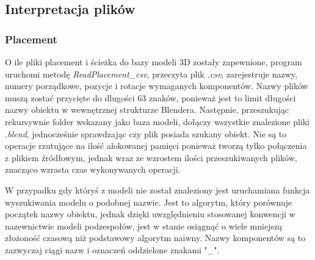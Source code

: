 \documentclass{xmgr}
\begin{document}
\subsection{Interpretacja plików}
\subsubsection{Placement}

O ile pliki placement i ścieżka do bazy modeli 3D zostały zapewnione, program uruchomi metodę \emph{ReadPlacement\_csv}, przeczyta plik \emph{.csv}, zarejestruje nazwy, numery porządkowe, pozycje i rotacje wymaganych komponentów. Nazwy plików muszą zostać przycięte do dlugości 63 znaków, ponieważ jest to limit długości nazwy obiektu w wewnętrznej strukturze Blendera. Następnie, przeszukując rekursywnie folder wskazany jako baza modeli, dołączy wszystkie znalezione pliki \emph{.blend}, jednocześnie sprawdzając czy plik posiada szukany obiekt. Nie są to operacje rzutujące na ilość alokowanej pamięci ponieważ tworzą tylko połączenia z plikiem źródłowym, jednak wraz ze wzrostem ilości przeszukiwanych plików, znacząco wzrasta czas wykonywanych operacji.

W przypadku gdy któryś z modeli nie został znaleziony jest uruchamiana funkcja wyszukiwania modelu o podobnej nazwie. Jest to algorytm, który porównuje początek nazwy obiektu, jednak dzięki uwzględnieniu stosowanej konwencji w nazewnictwie modeli podzespołów, jest w stanie osiągnąć o wiele mniejszą złożoność czasową niż podstawowy algorytm naiwny. Nazwy komponentów są to zazwyczaj ciągi nazw i oznaczeń oddzielone znakami "\_".
\end{document}
